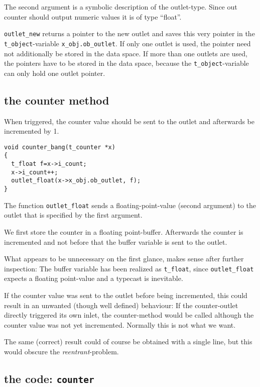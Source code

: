 \documentclass[12pt, a4paper,english,titlepage]{article}
\begin{document}
The second argument is a symbolic description of the outlet-type.
Since out counter should output numeric values it is of type ``float''.

\verb+outlet_new+ returns a pointer to the new outlet and saves this very pointer
in the \verb+t_object+-variable \verb+x_obj.ob_outlet+.
If only one outlet is used, the pointer need not additionally be stored in the data space.
If more than one outlets are used, the pointers have to be stored in the data space,
because the \verb+t_object+-variable can only hold one outlet pointer.

\subsection{the counter method}
When triggered, the counter value should be sent to the outlet
and afterwards be incremented by 1.

\begin{verbatim}
void counter_bang(t_counter *x)
{
  t_float f=x->i_count;
  x->i_count++;
  outlet_float(x->x_obj.ob_outlet, f);
}
\end{verbatim}

The function \verb+outlet_float+ sends a floating-point-value (second argument) to the outlet
that is specified by the first argument.

We first store the counter in a floating point-buffer.
Afterwards the counter is incremented and not before that the buffer variable is sent 
to the outlet.

What appears to be unnecessary on the first glance, makes sense after further
inspection:
The buffer variable has been realized as \verb+t_float+,
since \verb+outlet_float+ expects a floating point-value and a typecast is
inevitable.

If the counter value was sent to the outlet before being incremented,
this could result in an unwanted (though well defined) behaviour:
If the counter-outlet directly triggered its own inlet,
the counter-method would be called although the counter value was not yet incremented.
Normally this is not what we want.

The same (correct) result could of course be obtained with a single line,
but this  would obscure the {\em reentrant}-problem.

\subsection{the code: \tt counter}
\end{document}
